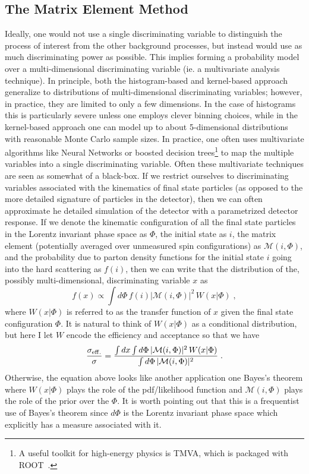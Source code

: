 \subsection{The Matrix Element Method}
Ideally, one would not use a single discriminating variable to distinguish the process of interest from the other background processes, but instead would use as much discriminating power as possible.  This implies forming a probability model over a multi-dimensional discriminating variable (ie. a multivariate analysis technique).  In principle, both the histogram-based and kernel-based approach generalize to distributions of multi-dimensional discriminating variables; however, in practice, they are limited to only a few dimensions. In the case of histograms this is particularly severe unless one employs clever binning choices, while in the kernel-based approach one can model up to about 5-dimensional distributions with reasonable Monte Carlo sample sizes.   In practice, one often uses multivariate algorithms like Neural Networks or boosted decision trees\footnote{A useful toolkit for high-energy physics is TMVA, which is packaged with ROOT~\cite{tmva}.} to map the multiple variables into a single discriminating variable.  Often these multivariate techniques are seen as somewhat of a black-box.  If we restrict ourselves to discriminating variables associated with the kinematics of final state particles (as opposed to the more detailed signature of particles in the detector), then we can often approximate he detailed simulation of the detector with a parametrized detector response.  If we denote the kinematic configuration of all the final state particles in the Lorentz invariant phase space as $\Phi$, the initial state as $i$,  the matrix element (potentially averaged over unmeasured spin configurations) as $\mathcal{M}(i,\Phi)$, and the probability due to parton density functions for the initial state $i$ going into the hard scattering  as $f(i)$, then we can write that the distribution of the, possibly multi-dimensional, discriminating variable $x$ as
\begin{equation}
f(x) \propto \int d\Phi \, f(i) |\mathcal{M}(i,\Phi)|^2 \, W(x | \Phi) \;,
\end{equation}
where $W(x|\Phi)$ is referred to as the transfer function of $x$ given the final state configuration $\Phi$.  It is natural to think of $W(x|\Phi)$ as a conditional distribution, but here I let $W$ encode the efficiency and acceptance so that we have
\begin{equation}
\frac{\sigma_{\rm eff.}}{\sigma} = \frac{\int dx \int d\Phi \, |\mathcal{M}(i,\Phi)|^2 \, W(x | \Phi) }{\int d\Phi \, |\mathcal{M}(i,\Phi)|^2 }\;.
\end{equation}
Otherwise, the equation above looks like another application one Bayes's theorem where $W(x|\Phi)$ plays the role of the pdf/likelihood function and $\mathcal{M}(i,\Phi)$ plays the role of the prior over the $\Phi$.  It is worth pointing out that this is a frequentist use of Bayes's theorem since $d\Phi$ is the Lorentz invariant phase space which explicitly has a measure associated with it.


